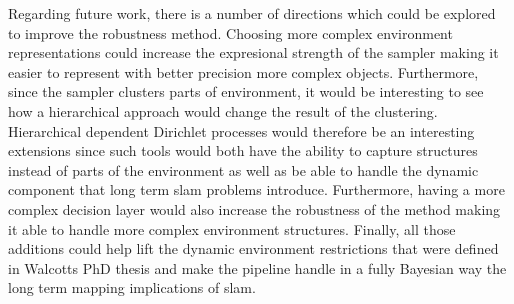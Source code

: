 \documentclass[]{article}
\begin{document}
    Regarding future work, there is a number of directions which could be explored to improve the robustness method. Choosing more complex environment representations could increase the expresional strength of the sampler making it easier to represent with better precision more complex objects. Furthermore, since the sampler clusters parts of environment, it would be interesting to see how a hierarchical approach would change the result of the clustering. Hierarchical dependent Dirichlet processes would therefore be an interesting extensions since such tools would both have the ability to capture structures instead of parts of the environment as well as be able to handle the dynamic component that long term slam problems introduce. Furthermore, having a more complex decision layer would also increase the robustness of the method making it able to handle more complex environment structures. Finally, all those additions could help lift the dynamic environment restrictions that were defined in Walcotts PhD thesis and make the pipeline handle in a fully Bayesian way the long term mapping implications of slam.


\end{document}
